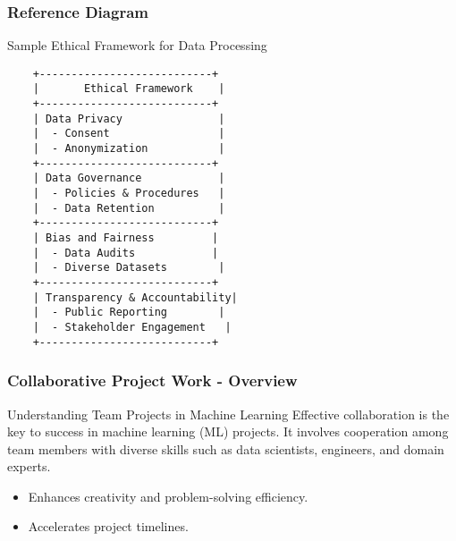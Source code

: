 \documentclass[aspectratio=169]{beamer}
\begin{document}
\begin{frame}[fragile]
    \frametitle{Reference Diagram}
    \begin{block}{Sample Ethical Framework for Data Processing}
    \begin{verbatim}
    +---------------------------+
    |       Ethical Framework    |
    +---------------------------+
    | Data Privacy               |
    |  - Consent                 |
    |  - Anonymization           |
    +---------------------------+
    | Data Governance            |
    |  - Policies & Procedures   |
    |  - Data Retention          |
    +---------------------------+
    | Bias and Fairness         |
    |  - Data Audits            |
    |  - Diverse Datasets        |
    +---------------------------+
    | Transparency & Accountability|
    |  - Public Reporting        |
    |  - Stakeholder Engagement   |
    +---------------------------+
    \end{verbatim}
    \end{block}
\end{frame}

\begin{frame}[fragile]
    \frametitle{Collaborative Project Work - Overview}
    \begin{block}{Understanding Team Projects in Machine Learning}
        Effective collaboration is the key to success in machine learning (ML) projects. It involves cooperation among team members with diverse skills such as data scientists, engineers, and domain experts.
        \begin{itemize}
            \item Enhances creativity and problem-solving efficiency.
            \item Accelerates project timelines.
        \end{itemize}
    \end{block}
\end{frame}
\end{document}
